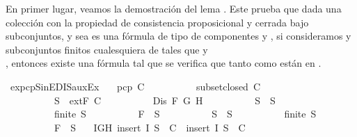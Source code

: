 \begin{isabellebody}
\begin{isamarkuptext}
  En primer lugar, veamos la demostración del lema . Este prueba que dada 
   una colección con la propiedad de consistencia proposicional y cerrada bajo subconjuntos, 
   y sea  es una fórmula de tipo \isa{{\isasymbeta}} de componentes  y , si consideramos  y 
   subconjuntos finitos cualesquiera de  tales que  y\\ , entonces existe una 
  fórmula  tal que se verifica que tanto  como  están en .%
\end{isamarkuptext}\isamarkuptrue%
\isamarkupfalse%
\ ex{}{\isacharunderscore}pcp{\isacharunderscore}SinE{\isacharunderscore}DIS{\isacharunderscore}auxEx{\isacharcolon}\isanewline
\ \ \ {\isachardoublequoteopen}pcp\ C{\isachardoublequoteclose}\isanewline
\ \ \ \ \ \ \ \ \ \ {\isachardoublequoteopen}subset{\isacharunderscore}closed\ C{\isachardoublequoteclose}\isanewline
\ \ \ \ \ \ \ \ \ \ {\isachardoublequoteopen}S\ {\isasymin}\ {\isacharparenleft}extF\ C{\isacharparenright}{\isachardoublequoteclose}\isanewline
\ \ \ \ \ \ \ \ \ \ {\isachardoublequoteopen}Dis\ F\ G\ H{\isachardoublequoteclose}\isanewline
\ \ \ \ \ \ \ \ \ \ {\isachardoublequoteopen}S{}\ {\isasymsubseteq}\ S{\isachardoublequoteclose}\isanewline
\ \ \ \ \ \ \ \ \ \ {\isachardoublequoteopen}finite\ S{}{\isachardoublequoteclose}\isanewline
\ \ \ \ \ \ \ \ \ \ {\isachardoublequoteopen}F\ {\isasymin}\ S{}{\isachardoublequoteclose}\isanewline
\ \ \ \ \ \ \ \ \ \ {\isachardoublequoteopen}S{}\ {\isasymsubseteq}\ S{\isachardoublequoteclose}\isanewline
\ \ \ \ \ \ \ \ \ \ {\isachardoublequoteopen}finite\ S{}{\isachardoublequoteclose}\isanewline
\ \ \ \ \ \ \ \ \ \ {\isachardoublequoteopen}F\ {\isasymin}\ S{}{\isachardoublequoteclose}\isanewline
\ \ \ {\isachardoublequoteopen}{\isasymexists}I{\isasymin}{\isacharbraceleft}G{\isacharcomma}H{\isacharbraceright}{\isachardot}\ insert\ I\ S{}\ {\isasymin}\ C\ {\isasymand}\ insert\ I\ S{}\ {\isasymin}\ C{\isachardoublequoteclose}\ \isanewline

\end{isabellebody}
